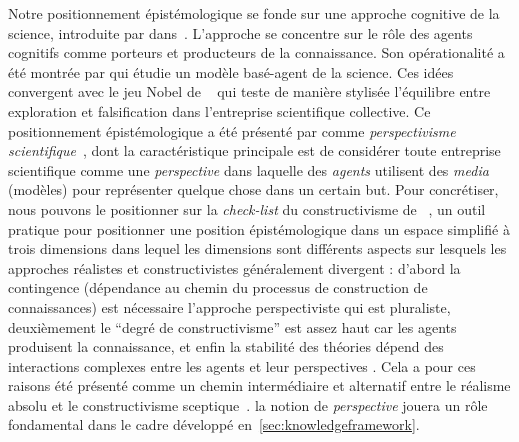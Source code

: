 {Notre positionnement épistémologique se fonde sur une approche cognitive de la science, introduite par  dans~\cite{giere2010explaining}. L'approche se concentre sur le rôle des agents cognitifs comme porteurs et producteurs de la connaissance. Son opérationalité a été montrée par \cite{giere2010agent} qui étudie un modèle basé-agent de la science. Ces idées convergent avec le jeu Nobel de ~\cite{chavalarias2016s} qui teste de manière stylisée l'équilibre entre exploration et falsification  dans l'entreprise scientifique collective. Ce positionnement épistémologique a été présenté par  comme \emph{perspectivisme scientifique}~\cite{giere2010scientific}, dont la caractéristique principale est de considérer toute entreprise scientifique comme une \emph{perspective} dans laquelle des \emph{agents} utilisent des \emph{media} (modèles) pour représenter quelque chose dans un certain but. Pour concrétiser, nous pouvons le positionner sur la \emph{check-list} du constructivisme de ~\cite{hacking1999social}, un outil pratique pour positionner une position épistémologique dans un espace simplifié à trois dimensions dans lequel les dimensions sont différents aspects sur lesquels les approches réalistes et constructivistes généralement divergent : d'abord la contingence (dépendance au chemin du processus de construction de connaissances) est nécessaire l'approche perspectiviste qui est pluraliste, deuxièmement le ``degré de constructivisme'' est assez haut car les agents produisent la connaissance, et enfin la stabilité des théories dépend des interactions complexes entre les agents et leur perspectives . Cela a pour ces raisons été présenté comme un chemin intermédiaire et alternatif entre le réalisme absolu et le constructivisme sceptique~\cite{brown2009models}. la notion de \emph{perspective} jouera un rôle fondamental dans le cadre développé en~\ref{sec:knowledgeframework}.
}

